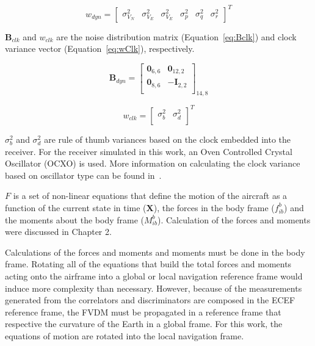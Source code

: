 \begin{equation}\label{eq:wDyn}
    w_{dyn} = \begin{bmatrix}
        \sigma^2_{V_N} & \sigma^2_{V_E} & \sigma^2_{V_E} & \sigma^2_{p} & \sigma^2_{q} & \sigma^2_{r}
    \end{bmatrix}^T
\end{equation}

\(\mathbf{B}_{clk}\) and \(w_{clk}\) are the noise distribution matrix (Equation~\ref{eq:Bclk}) and clock variance vector (Equation~\ref{eq:wClk}), respectively.

\begin{equation}\label{eq:Bclk}
    \mathbf{B}_{dyn} =\begin{bmatrix}
        \mathbf{0}_{6,6} & \mathbf{0}_{12,2} \\
        \mathbf{0}_{8,6} & -\mathbf{I}_{2,2} \\
    \end{bmatrix}_{14,8}
\end{equation}

\begin{equation}\label{eq:wClk}
    w_{clk} = \begin{bmatrix}
        \sigma^2_b & \sigma^2_d \\
    \end{bmatrix}^T
\end{equation}

\(\sigma^2_b\) and \(\sigma^2_d\) are rule of thumb variances based on the clock embedded into the receiver. For the receiver simulated in this work, an Oven Controlled Crystal Oscillator (OCXO) is used. More information on calculating the clock variance based on oscillator type can be found in~\cite{}.

\(F\) is a set of non-linear equations that define the motion of the aircraft as a function of the current state in time (\(\mathbf{X}\)), the forces in the body frame (\(f_{ib}^b\)) and the moments about the body frame (\(M_{ib}^b\)). Calculation of the forces and moments were discussed in Chapter 2.

Calculations of the forces and moments and moments must be done in the body frame. Rotating all of the equations that build the total forces and moments acting onto the airframe into a global or local navigation reference frame would induce more complexity than necessary. However, because of the measurements generated from the correlators and discriminators are composed in the ECEF reference frame, the FVDM must be propagated in a reference frame that respective the curvature of the Earth in a global frame. For this work, the equations of motion are rotated into the local navigation frame.

